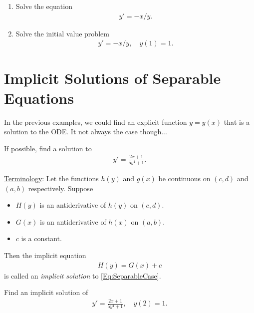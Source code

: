 \documentclass[12pt,a4paper]{article}
\newcounter{example}[section]
\begin{document}
\newpage

\begin{example}
\begin{enumerate}
\item Solve the equation
	\begin{align*}
	y' = -x/y .
	\end{align*}
\item Solve the initial value problem
	\begin{align*}
	y' = -x/y , \quad y(1) = 1 .
	\end{align*}
\end{enumerate}
\end{example}

\newpage

\section{Implicit Solutions of Separable Equations}
In the previous examples, we could find an explicit function $y = y(x)$ that is a solution to the ODE. It not always the case though...

\vspace*{16pt}

\begin{example}
If possible, find a solution to
	\begin{align*}
	y' = \frac{2x + 1}{5y^4 + 1} .
	\end{align*}
\end{example}

\vfill

\underline{Terminology}:
Let the functions $h (y)$ and $g(x)$ be continuous on $(c, d)$ and $(a, b)$ respectively. Suppose
	\begin{itemize}
	\item $H(y)$ is an antiderivative of $h(y)$ on $(c, d)$.
	\item $G(x)$ is an antiderivative of $h(x)$ on $(a, b)$.
	\item $c$ is a constant.
	\end{itemize}
Then the implicit equation
	\begin{align*}
	H(y) = G(x) + c
	\end{align*}
is called an \textit{implicit solution} to \eqref{Eq:SeparableCase}.

\newpage

\begin{example}
Find an implicit solution of
	\begin{align*}
	y' = \frac{2x + 1}{5y^4 + 1} , \quad y(2) = 1 .
	\end{align*}
\end{example}
\end{document}
